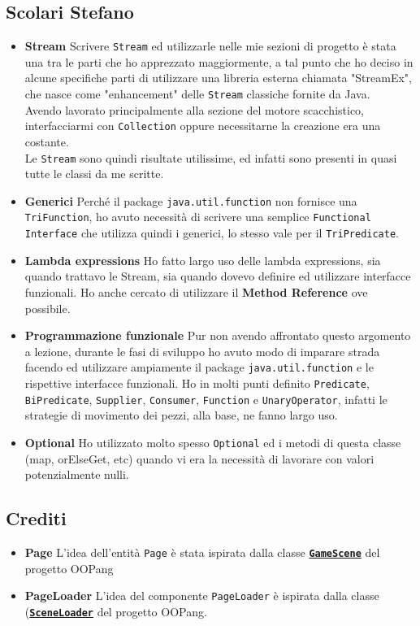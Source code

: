 \documentclass[a4paper,12pt]{report}
\begin{document}
\subsection{Scolari Stefano}
\begin{itemize}
\item \textbf{Stream} Scrivere \texttt{Stream} ed utilizzarle nelle mie sezioni di progetto è stata una tra le parti che ho apprezzato maggiormente, a tal punto che ho deciso in alcune specifiche parti di utilizzare una libreria esterna chiamata "StreamEx", che nasce come "enhancement" delle \texttt{Stream} classiche fornite da Java.
\\
Avendo lavorato principalmente alla sezione del motore scacchistico, interfacciarmi con \texttt{Collection} oppure necessitarne la creazione era una costante. 
\\
Le \texttt{Stream} sono quindi risultate utilissime, ed infatti sono presenti in quasi tutte le classi da me scritte.
\item \textbf{Generici} Perché il package \texttt{java.util.function} non fornisce una \texttt{TriFunction}, ho avuto necessità di scrivere una semplice \texttt{Functional Interface} che utilizza quindi i generici, lo stesso vale per il \texttt{TriPredicate}.
\item \textbf{Lambda expressions} Ho fatto largo uso delle lambda expressions, sia quando trattavo le Stream, sia quando dovevo definire ed utilizzare interfacce funzionali. Ho anche cercato di utilizzare il \textbf{Method Reference} ove possibile.
\item \textbf{Programmazione funzionale} Pur non avendo affrontato questo argomento a lezione, durante le fasi di sviluppo ho avuto modo di imparare strada facendo ed utilizzare ampiamente il package \texttt{java.util.function} e le rispettive interfacce funzionali.
Ho in molti punti definito \texttt{Predicate}, \texttt{BiPredicate}, \texttt{Supplier}, \texttt{Consumer}, \texttt{Function} e \texttt{UnaryOperator}, infatti le strategie di movimento dei pezzi, alla base, ne fanno largo uso.
\item \textbf{Optional} Ho utilizzato molto spesso \texttt{Optional} ed i metodi di questa classe (map, orElseGet, etc) quando vi era la necessità di lavorare con valori potenzialmente nulli.
\end{itemize}

\subsection{Crediti}
\begin{itemize}
    \item \textbf{Page} L'idea dell'entità \texttt{Page} è stata ispirata dalla classe \href{https://bitbucket.org/danysk/oop17-burattini-samuele-ciarafoni-nicholas-dente-francesco/src/master/src/oopang/view/GameScene.java}{\textbf{\texttt{GameScene}}} del progetto OOPang
    \item \textbf{PageLoader} L'idea del componente \texttt{PageLoader} è ispirata dalla classe (\href{https://bitbucket.org/danysk/oop17-burattini-samuele-ciarafoni-nicholas-dente-francesco/src/master/src/oopang/view/javafx/SceneLoader.java}{\textbf{\texttt{SceneLoader}}} del progetto OOPang.
\end{itemize}
\end{document}
